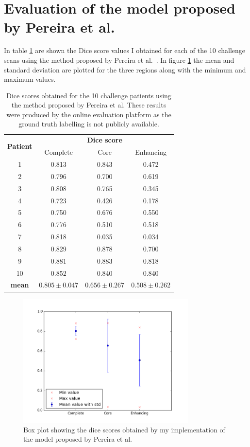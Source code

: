 \documentclass[12pt,a4paper,twoside,openright]{report}
\begin{document}
\section{Evaluation of the model proposed by Pereira et al.}
In table \ref{table:pereira_dice_results} are shown the Dice score values I obtained for each of the 10 challenge scans using the method proposed by Pereira et al.\ \cite{pereira}. In figure \ref{pereira_box_plot} the mean and standard deviation are plotted for the three regions along with the minimum and maximum values. \begin{table}
\centering	
\begin{tabular}{ c | c c c} 
\multirow{2}{*}{\textbf{Patient}} & \multicolumn{3}{c}{\textbf{Dice score}} \\
 & Complete & Core & Enhancing \\
 \hline
1 & 0.813 & 0.843 & 0.472 \\
2 & 0.796 & 0.700 & 0.619 \\
3 & 0.808 & 0.765 & 0.345 \\
4 & 0.723 & 0.426 & 0.178 \\
5 & 0.750 & 0.676 & 0.550 \\
6 & 0.776 & 0.510 & 0.518 \\
7 & 0.818 & 0.035 & 0.034 \\
8 & 0.829 & 0.878 & 0.700 \\
9 & 0.881 & 0.883 & 0.818 \\
10 & 0.852 & 0.840 & 0.840 \\
\hline
\rule{0pt}{3ex}    
\textbf{mean} & $0.805 \pm 0.047$ & $0.656 \pm 0.267$ & $0.508 \pm 0.262$
\end{tabular}
\caption{Dice scores obtained for the 10 challenge patients using the method proposed by Pereira et al. These results were produced by the online evaluation platform as the ground truth labelling is not publicly available.}
\label{table:pereira_dice_results}
\end{table}

\begin{figure}
	\centering
	\includegraphics[width=0.8\textwidth]{pereira_box_plot}
	\caption{Box plot showing the dice scores obtained by my implementation of the model proposed by Pereira et al.}
	\label{pereira_box_plot}
\end{figure}
\end{document}
